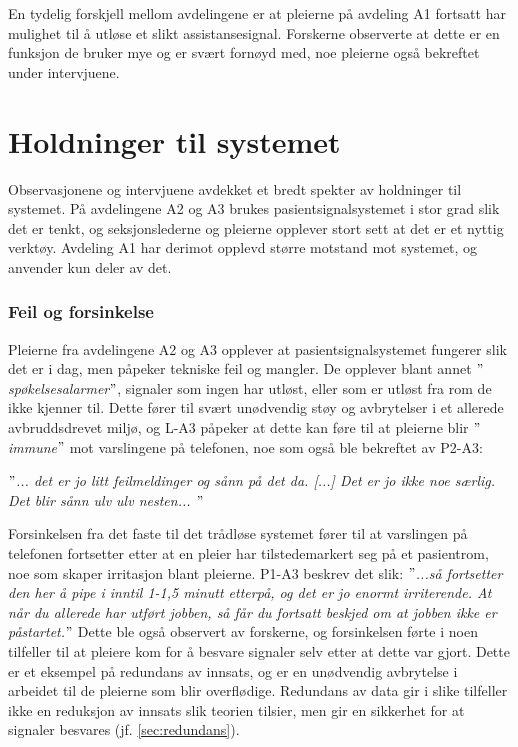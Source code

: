 \noindent
En tydelig forskjell mellom avdelingene er at pleierne på avdeling A1 fortsatt har mulighet til å utløse et slikt assistansesignal. Forskerne observerte at dette er en funksjon de bruker mye og er svært fornøyd med, noe pleierne også bekreftet under intervjuene. 

\section{Holdninger til systemet}
Observasjonene og intervjuene avdekket et bredt spekter av holdninger til systemet. På avdelingene A2 og A3 brukes pasientsignalsystemet i stor grad slik det er tenkt, og seksjonslederne og pleierne opplever stort sett at det er et nyttig verktøy. Avdeling A1 har derimot opplevd større motstand mot systemet, og anvender kun deler av det.

\subsubsection{Feil og forsinkelse}
Pleierne fra avdelingene A2 og A3 opplever at pasientsignalsystemet fungerer slik det er i dag, men påpeker tekniske feil og mangler. De opplever blant annet \textit{$"$spøkelsesalarmer$"$}, signaler som ingen har utløst, eller som er utløst fra rom de ikke kjenner til. Dette fører til svært unødvendig støy og avbrytelser i et allerede avbruddsdrevet miljø, og L-A3 påpeker at dette kan føre til at pleierne blir \textit{$"$immune$"$} mot varslingene på telefonen, noe som også ble bekreftet av P2-A3:

\noindent
\textit{$"$... det er jo litt feilmeldinger og sånn på det da. [...] Det er jo ikke noe særlig. Det blir sånn ulv ulv nesten... $"$}

\noindent 
Forsinkelsen fra det faste til det trådløse systemet fører til at varslingen på telefonen fortsetter etter at en pleier har tilstedemarkert seg på et pasientrom, noe som skaper irritasjon blant pleierne. P1-A3 beskrev det slik: \textit{$"$...så fortsetter den her å pipe i inntil 1-1,5 minutt etterpå, og det er jo enormt irriterende. At når du allerede har utført jobben, så får du fortsatt beskjed om at jobben ikke er påstartet.$"$} Dette ble også observert av forskerne, og forsinkelsen førte i noen tilfeller til at pleiere kom for å besvare signaler selv etter at dette var gjort. Dette er et eksempel på redundans av innsats, og er en unødvendig avbrytelse i arbeidet til de pleierne som blir overflødige. Redundans av data gir i slike tilfeller ikke en reduksjon av innsats slik teorien tilsier, men gir en sikkerhet for at signaler besvares (jf. \ref {sec:redundans}). 

